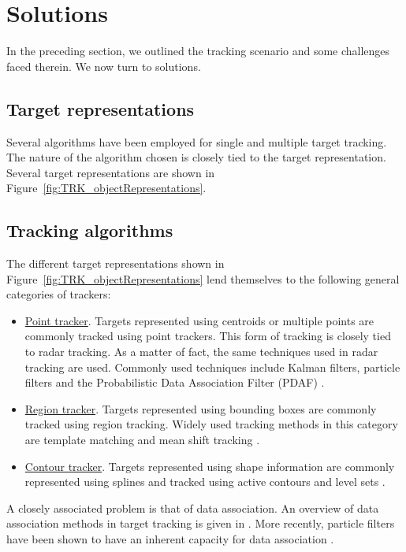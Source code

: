 \section{Solutions}
In the preceding section, we outlined the tracking scenario and some challenges faced therein.  We now turn to solutions.  

\subsection{Target representations}
Several algorithms have been employed for single and multiple target tracking.  The nature of the algorithm chosen is closely tied to the target representation.  Several target representations are shown in Figure~\ref{fig:TRK_objectRepresentations}.  

\subsection{Tracking algorithms}
The different target representations shown in Figure~\ref{fig:TRK_objectRepresentations} lend themselves to the following general categories of trackers:

\begin{itemize}
\item \underline{Point tracker}.  Targets represented using centroids or multiple points are commonly tracked using point trackers.  This form of tracking is closely tied to radar tracking.  As a matter of fact, the same techniques used in radar tracking are used.  Commonly used techniques include Kalman filters, particle filters and the Probabilistic Data Association Filter (PDAF) \cite{1983_JNL_JPDAF_Fortmann}.
\item \underline{Region tracker}.  Targets represented using bounding boxes are commonly tracked using region tracking.  Widely used tracking methods in this category are template matching and mean shift tracking \cite{2002_JNL_MeanShift_Comaniciu}.
\item \underline{Contour tracker}.  Targets represented using shape information are commonly represented using splines and tracked using active contours \cite{2000_BOOK_ActiveVision_Blake} and level sets \cite{1995_JNL_LevelSets_Malladi}.
\end{itemize}

A closely associated problem is that of data association.  An overview of data association methods in target tracking is given in \cite{1993_JNL_SURVEYcorresp_Cox}.  More recently, particle filters have been shown to have an inherent capacity for data association \cite{1998_JNL_Condensation_IsardBlake}.   

